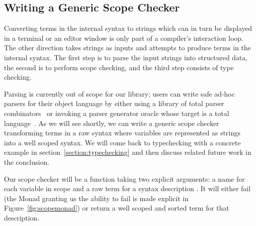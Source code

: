 \subsection{Writing a Generic Scope Checker}\label{section:genericscoping}

Converting terms in the internal syntax to strings which can in turn be
displayed in a terminal or an editor window is only part of a compiler's
interaction loop. The other direction takes strings as inputs and attempts to
produce terms in the internal syntax. The first step is to parse the input
strings into structured data, the second is to perform scope checking,
and the third step consists of type checking.

Parsing is currently out of scope for our library; users can write safe
ad-hoc parsers for their object language by either using a library of total
parser combinators~\cite{DBLP:conf/icfp/Danielsson10,allais2018agdarsec}
or invoking a parser generator oracle whose target is a total
language~\cite{Stump:2016:VFP:2841316}. As we will see shortly, we can
write a generic scope checker transforming terms in a raw syntax where
variables are represented as strings into a well scoped syntax. We will
come back to typechecking with a concrete example in section~\ref{section:typechecking}
and then discuss related future work in the conclusion.

Our scope checker will be a function taking two explicit arguments: a name for
each variable in scope  and a raw term for a syntax description .
It will either fail (the Monad  granting us the ability to fail is made
explicit in Figure~\ref{fig:scopemonad}) or return a well scoped and sorted
term for that description.

\begin{agdasnippet}
\end{agdasnippet}

